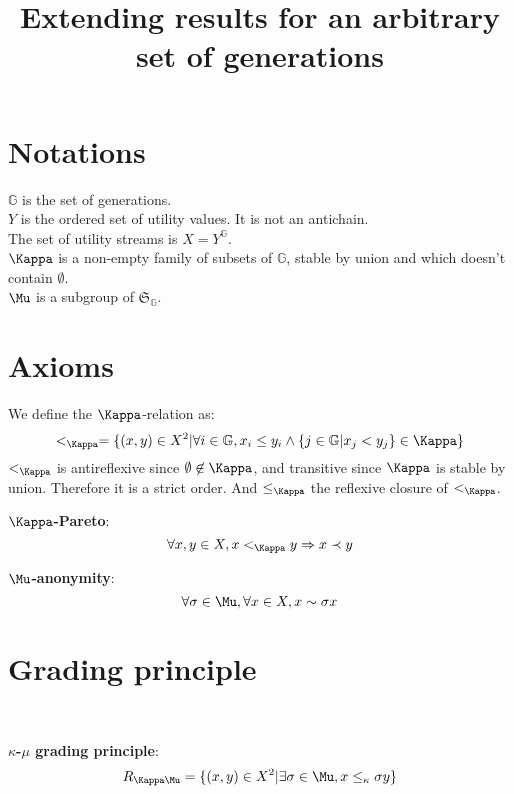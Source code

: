 \documentclass{article}
\title{Extending results for an arbitrary set of generations}
\author{}
\newcommand{\G}{\mathbb{G}}
\begin{document}
\maketitle

\section{Notations}

$\G$ is the set of generations. \\
$Y$ is the ordered set of utility values. It is not an antichain.\\
The set of utility streams is $X=Y^\G$.\\
$\Kappa$ is a non-empty family of subsets of $\G$, stable by union and which doesn't contain $\emptyset$. \\
$\Mu$ is a subgroup of $\mathfrak{S}_\G$.

\section{Axioms}

We define the $\Kappa$-relation as:
\[<_\Kappa = \{(x,y)\in X^2|\forall i\in \G, x_i \leq y_i \land \{j \in \G | x_j < y_j\}\in\Kappa\}\]
$<_\Kappa$ is antireflexive since $\emptyset\not\in\Kappa$, and transitive since $\Kappa$ is stable by union. Therefore it is a strict order.
And $\leq_\Kappa$ the reflexive closure of $<_\Kappa$.\smallskip\par

\textbf{$\Kappa$-Pareto}:
\[\forall x,y\in X, x <_\Kappa y \Rightarrow x \prec y\]

\textbf{$\Mu$-anonymity}:
\[\forall\sigma\in\Mu,\forall x\in X, x \sim \sigma x\]

\section{Grading principle}
\ \par
\textbf{$\kappa$-$\mu$ grading principle}:
\[R_{\Kappa\Mu} = \{(x,y)\in X^2 | \exists\sigma\in\Mu, x \leq_\kappa \sigma y\}\]
\end{document}
